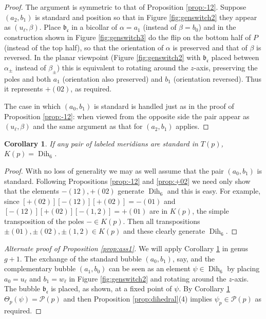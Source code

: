 \documentclass[12pt]{amsart}
\newtheorem{cor}[thm]{Corollary}
\newcommand{\calP}{\mathcal P}
\newcommand{\Dih}{\operatorname{Dih}}
\newcommand{\frb}{\mathfrak{b}}
\newcommand{\frc}{\mbox{$\mathfrak{c}$}}
\begin{document}
   \begin{proof}  The argument is symmetric to that of Proposition \ref{prop:-12}.  Suppose $(a_2, b_1)$ is standard and position so that in Figure \ref{fig:genswitch2} they appear as $(u_\ell, \beta)$.  Place $\frb_{\frc}$ in a bicollar of $\alpha = a_1$ (instead of $\beta = b_0$) and in the construction shown in Figure \ref{fig:genswitch3} do the flip on the bottom half of $P$ (instead of the top half), so that the orientation of $\alpha$ is preserved and that of $\beta$ is reversed.  In the planar viewpoint (Figure \ref{fig:genswitch2} with $\frb_{\frc}$ placed between $\alpha_{\pm}$ instead of $\beta_{\pm}$) this is equivalent to rotating around the $z$-axis, preserving the poles and both $a_1$ (orientation also preserved) and $b_1$ (orientation reversed).  Thus it represents $+(02)$, as required.  
   
   The case in which $(a_0, b_1)$ is standard is handled just as in the proof of Proposition \ref{prop:-12}: when viewed from the opposite side the pair appear as $(u_\ell, \beta)$ and the same argument as that for $(a_2, b_1)$ applies.  
   \end{proof}
    
 \begin{cor} \label{cor:Dih6inP} If any pair of labeled meridians are standard in $T(p)$, $K(p) = \Dih_6$.
     \end{cor}
    
\begin{proof} With no loss of generality we may as well assume that the pair $(a_0, b_1)$ is standard.  Following Propositions \ref{prop:-12} and \ref{prop:+02} we need only show that the elements $-(12), +(02)$ generate $\Dih_6$ and this is easy.  For example, since $[+(02)][-(12)] [+(02)] = -(01)$ and $[-(12)][+(02)][-(1,2)] = +(01)$ are in $K(p)$, the simple transposition of the poles $-\in K(p)$.  Then all transpositions $\pm(01), \pm(02), \pm(1,2) \in K(p)$ and these clearly generate $\Dih_6$.  
\end{proof}

\begin{proof}[Alternate proof of Proposition \ref{prop:ass1}]  We will apply Corollary \ref{cor:Dih6inP} in genus $g+1$.  The exchange of the standard bubble $(a_0, b_1)$, say, and the complementary bubble $(a_1, b_0)$ can be seen as an element $\psi \in \Dih_6$ by placing $a_0 = u_{\ell}$ and $b_1=w_{\ell}$ in Figure \ref{fig:genswitch2} and rotating around the $z$-axis.  The bubble $\frb_{\frc}$ is placed, as shown, at a fixed point of $\psi$.  By Corollary \ref{cor:Dih6inP} $\Theta_p(\psi) = \calP(p)$ and then Proposition \ref{prop:dihedral}(4) implies $\psi_p \in \calP(p)$ as required.  
\end{proof}
\end{document}
